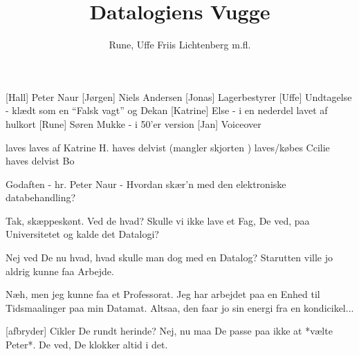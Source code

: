 \documentclass[a4paper,12pt]{article}
\title{Datalogiens Vugge}
\author{Rune, Uffe Friis Lichtenberg m.fl.}
\begin{document}
\maketitle

\begin{sketch}

\begin{roles}
 [Hall] Peter Naur
 [Jørgen] Niels Andersen
 [Jonas] Lagerbestyrer
 [Uffe] Undtagelse - klædt som en ``Falsk vagt'' og Dekan
 [Katrine] Else - i en nederdel lavet af hulkort
 [Rune] Søren Mukke - i 50'er version
 [Jan] Voiceover
\end{roles}

\begin{props}
  laves
  laves af Katrine H.
  haves delvist (mangler skjorten
)  laves/købes
  Ccilie
  haves delvist
  Bo
\end{props}



 Godaften - hr. Peter Naur - Hvordan skær'n med den
elektroniske databehandling?

 Tak, skæppeskønt. Ved de hvad? Skulle vi ikke lave et Fag, De
ved, paa Universitetet og kalde det Datalogi?

 Nej ved De nu hvad, hvad skulle man dog med en Datalog?
Starutten ville jo aldrig kunne faa Arbejde.

 Næh, men jeg kunne faa et Professorat.  Jeg har
arbejdet paa en Enhed til Tidsmaalinger paa min Datamat. Altsaa, den
faar jo sin energi fra en kondicikel...


[afbryder] Cikler De rundt herinde? Nej, nu maa De passe paa
ikke at *vælte Peter*. De ved, De klokker altid i det.


\end{sketch}
\end{document}
